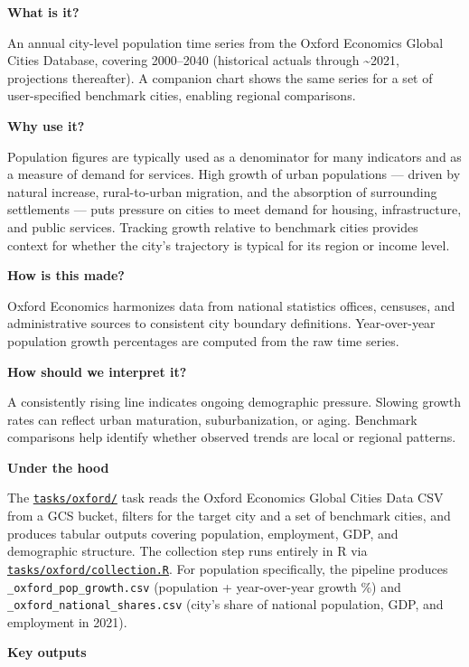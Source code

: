 \documentclass[
  letterpaper,
  DIV=11,
  numbers=noendperiod]{scrreprt}
\begin{document}
\textbf{What is it?}

An annual city-level population time series from the Oxford Economics
Global Cities Database, covering 2000--2040 (historical actuals through
\textasciitilde2021, projections thereafter). A companion chart shows
the same series for a set of user-specified benchmark cities, enabling
regional comparisons.

\textbf{Why use it?}

Population figures are typically used as a denominator for many
indicators and as a measure of demand for services. High growth of urban
populations --- driven by natural increase, rural-to-urban migration,
and the absorption of surrounding settlements --- puts pressure on
cities to meet demand for housing, infrastructure, and public services.
Tracking growth relative to benchmark cities provides context for
whether the city's trajectory is typical for its region or income level.

\textbf{How is this made?}

Oxford Economics harmonizes data from national statistics offices,
censuses, and administrative sources to consistent city boundary
definitions. Year-over-year population growth percentages are computed
from the raw time series.

\textbf{How should we interpret it?}

A consistently rising line indicates ongoing demographic pressure.
Slowing growth rates can reflect urban maturation, suburbanization, or
aging. Benchmark comparisons help identify whether observed trends are
local or regional patterns.

\textbf{Under the hood}

The \href{../tasks/oxford/}{\texttt{tasks/oxford/}} task reads the
Oxford Economics Global Cities Data CSV from a GCS bucket, filters for
the target city and a set of benchmark cities, and produces tabular
outputs covering population, employment, GDP, and demographic structure.
The collection step runs entirely in R via
\href{../tasks/oxford/collection.R}{\texttt{tasks/oxford/collection.R}}.
For population specifically, the pipeline produces
\texttt{\_oxford\_pop\_growth.csv} (population + year-over-year growth
\%) and \texttt{\_oxford\_national\_shares.csv} (city's share of
national population, GDP, and employment in 2021).

\textbf{Key outputs}
\end{document}
